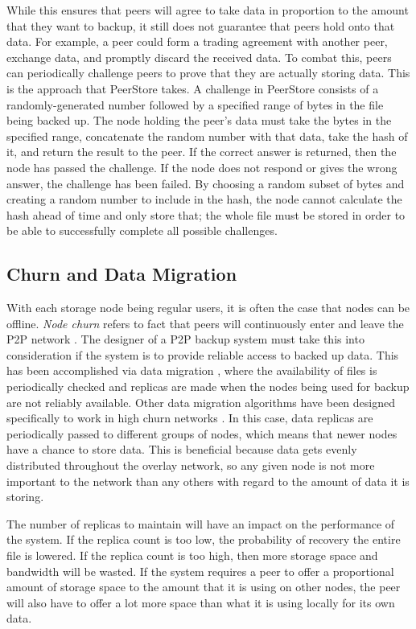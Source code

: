 \documentclass[12pt]{report}
\begin{document}
While this ensures that peers will agree to take data in proportion to the amount that they want to backup, it still does not guarantee that peers hold onto that data. For example, a peer could form a trading agreement with another peer, exchange data, and promptly discard the received data. To combat this, peers can periodically challenge peers to prove that they are actually storing data. This is the approach that PeerStore takes. A challenge in PeerStore consists of a randomly-generated number followed by a specified range of bytes in the file being backed up. The node holding the peer's data must take the bytes in the specified range, concatenate the random number with that data, take the hash of it, and return the result to the peer. If the correct answer is returned, then the node has passed the challenge. If the node does not respond or gives the wrong answer, the challenge has been failed. By choosing a random subset of bytes and creating a random number to include in the hash, the node cannot calculate the hash ahead of time and only store that; the whole file must be stored in order to be able to successfully complete all possible challenges.

\subsection{Churn and Data Migration}
With each storage node being regular users, it is often the case that nodes can be offline. \textit{Node churn} refers to fact that peers will continuously enter and leave the P2P network \cite{StorageSearchP2PNetworks}. The designer of a P2P backup system must take this into consideration if the system is to provide reliable access to backed up data. This has been accomplished via data migration \cite{pStore,PeerStore}, where the availability of files is periodically checked and replicas are made when the nodes being used for backup are not reliably available. Other data migration algorithms have been designed specifically to work in high churn networks \cite{StorageSearchP2PNetworks}. In this case, data replicas are periodically passed to different groups of nodes, which means that newer nodes have a chance to store data. This is beneficial because data gets evenly distributed throughout the overlay network, so any given node is not more important to the network than any others with regard to the amount of data it is storing.

The number of replicas to maintain will have an impact on the performance of the system. If the replica count is too low, the probability of recovery the entire file is lowered. If the replica count is too high, then more storage space and bandwidth will be wasted. If the system requires a peer to offer a proportional amount of storage space to the amount that it is using on other nodes, the peer will also have to offer a lot more space than what it is using locally for its own data.
\end{document}
